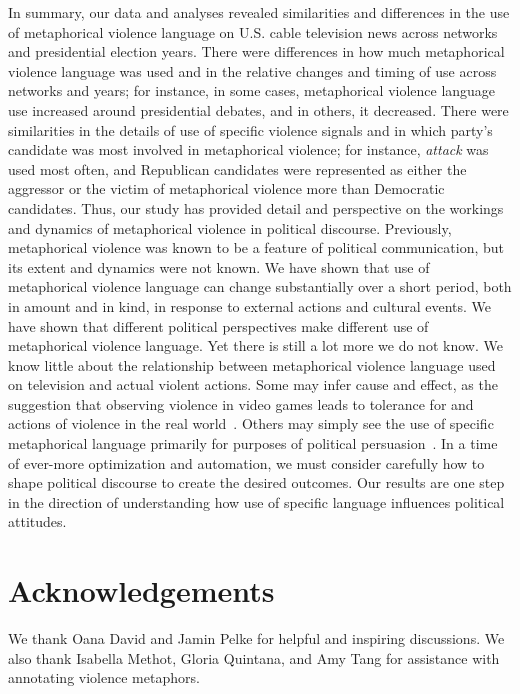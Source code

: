 In summary, our data and analyses revealed similarities and differences in the
use of metaphorical violence language on U.S. cable television news across
networks and presidential election years. There were differences in how much
metaphorical violence language was used and in the relative changes and timing
of use across networks and years; for instance, in some cases, metaphorical
violence language use increased around presidential debates, and in others, it
decreased. There were similarities in the details of use of specific violence
signals and in which party's candidate was most involved in metaphorical
violence; for instance, \emph{attack} was used most often, and Republican
candidates were represented as either the aggressor or the victim of
metaphorical violence more than Democratic candidates.  Thus, our study has
provided detail and perspective on the workings and dynamics of metaphorical
violence in political discourse. Previously, metaphorical violence was known to
be a feature of political communication, but its extent and dynamics were not
known. We have shown that use of metaphorical violence language can change
substantially over a short period, both in amount and in kind, in response to
external actions and cultural events. We have shown that different political
perspectives make different use of metaphorical violence language. Yet there is
still a lot more we do not know.  We know little about the relationship between
metaphorical violence language used on television and actual violent actions.
Some may infer cause and effect, as the suggestion that observing violence in
video games leads to tolerance for and actions of violence in the real
world~\cite{Calvert2017}. Others may simply see the use of specific metaphorical
language primarily for purposes of political
persuasion~\cite{Charteris-Black2009,Mio1997}. In a time of ever-more
optimization and automation, we must consider carefully how to shape political
discourse to create the desired outcomes. Our results are one step in the
direction of understanding how use of specific language influences political
attitudes.  

\section*{Acknowledgements}

We thank Oana David and Jamin Pelke for helpful and inspiring discussions. We also thank
Isabella Methot, Gloria Quintana, and Amy Tang for assistance with annotating
violence metaphors.
